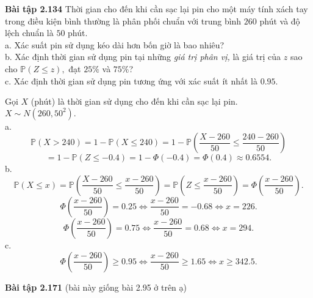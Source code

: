 \documentclass[12pt,a4paper]{article}
\begin{document}
\begin{mybox}
\textbf{Bài tập 2.134} Thời gian cho đến khi cần sạc lại pin cho một máy tính xách tay trong điều kiện bình thường là phân phối chuẩn với trung bình $260$ phút và độ lệch chuẩn là $50$ phút.\\
a. Xác suất pin sử dụng kéo dài hơn bốn giờ là bao nhiêu?\\
b. Xác định thời gian sử dụng pin tại những \textit{giá trị phân vị,} là giá trị của $z$ sao cho $\mathbb{P} \left( {Z \leqslant z} \right),$ đạt $25 \%$ và $75 \%$?\\
c. Xác định thời gian sử dụng pin tương ứng với xác suất ít nhất là $0.95.$\\
\end{mybox}
Gọi $X$ (phút) là thời gian sử dụng cho đến khi cần sạc lại pin.\\
$X \sim N \left( {260, 50^2} \right).$\\
a. $$\mathbb{P} \left( {X > 240} \right) = 1 - \mathbb{P} \left( {X \leqslant 240} \right) = 1 - \mathbb{P} \left( {\frac{X - 260}{50} \leqslant \frac{240 - 260}{50}} \right)$$ 
$$= 1 - \mathbb{P} \left( {Z \leqslant -0.4} \right) = 1 - \Phi \left( {-0.4} \right) = \Phi \left( {0.4} \right) \approx 0.6554.$$
b. $$\mathbb{P} \left( {X \leqslant x} \right) = \mathbb{P} \left( {\frac{X - 260}{50} \leqslant \frac{x - 260}{50}} \right) = \mathbb{P}\left( {Z  \leqslant \frac{x - 260}{50}} \right) = \Phi \left( {\frac{x - 260}{50}} \right).$$
$$\Phi \left( {\frac{x - 260}{50}} \right) = 0.25 \Leftrightarrow \frac{x - 260}{50} = -0.68 \Leftrightarrow x = 226.$$
$$\Phi \left( {\frac{x - 260}{50}} \right) = 0.75 \Leftrightarrow \frac{x - 260}{50} = 0.68 \Leftrightarrow x = 294.$$
c. $$\Phi \left( {\frac{x - 260}{50}} \right) \geqslant 0.95 \Leftrightarrow \frac{x - 260}{50} \geqslant 1.65 \Leftrightarrow x \geqslant 342.5.$$

\begin{mybox}
\textbf{Bài tập 2.171} (bài này giống bài 2.95 ở trên ạ)
\end{mybox}
\end{document}
